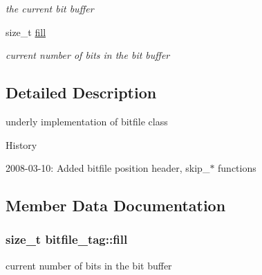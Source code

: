 \begin{DoxyCompactItemize}
\begin{DoxyCompactList}\small\item\em the current bit buffer \end{DoxyCompactList}\item 
size\+\_\+t \hyperlink{structbitfile__tag_a7c0f772984d9115919e4db0241c2e4b1}{fill}
\begin{DoxyCompactList}\small\item\em current number of bits in the bit buffer \end{DoxyCompactList}\end{DoxyCompactItemize}


\subsection{Detailed Description}
underly implementation of bitfile class 

History

2008-\/03-\/10\+: Added bitfile position header, skip\+\_\+$\ast$ functions 

\subsection{Member Data Documentation}
\hypertarget{structbitfile__tag_a7c0f772984d9115919e4db0241c2e4b1}{
\subsubsection[{fill}]{\setlength{\rightskip}{0pt plus 5cm}size\+\_\+t bitfile\+\_\+tag\+::fill}}\label{structbitfile__tag_a7c0f772984d9115919e4db0241c2e4b1}


current number of bits in the bit buffer 

